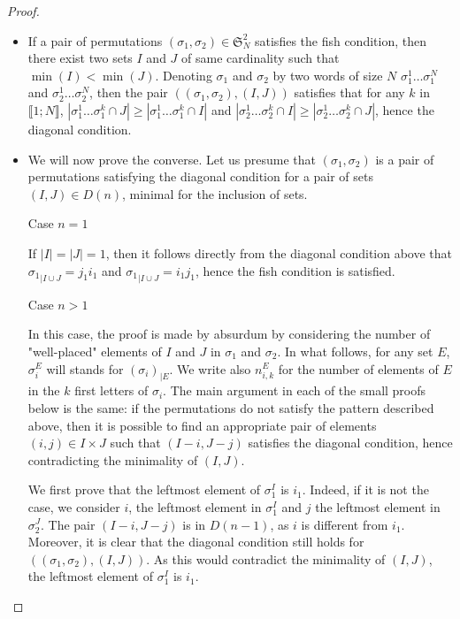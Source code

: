 \documentclass[11pt]{amsart}
\theoremstyle{definition}
\theoremstyle{remark}
\numberwithin{equation}{section}
\newcommand{\0}{\color{blue}{\mathsf{0}}}
\begin{document}
\begin{proof}
\begin{itemize}
\item If a pair of permutations $(\sigma_1, \sigma_2) \in   \mathfrak{S}_N^2$ satisfies the fish condition, then there exist two sets $I$ and $J$ of same cardinality such that $\min(I)<\min(J)$. Denoting $\sigma_1$ and $\sigma_2$ by two words of size $N$ $\sigma_1^1 \ldots \sigma_1^N$ and $\sigma_2^1 \ldots \sigma_2^N$, then the pair $((\sigma_1, \sigma_2), (I,J))$ satisfies that for any $k$ in $\llbracket 1;N\rrbracket$, $|\sigma_1^1 \ldots \sigma_1^k \cap J| \geq |\sigma_1^1 \ldots \sigma_1^k \cap I|$ and $|\sigma_2^1 \ldots \sigma_2^k \cap I| \geq |\sigma_2^1 \ldots \sigma_2^k \cap J|$, hence the diagonal condition.
\item We will now prove the converse. Let us presume that $(\sigma_1, \sigma_2)$ is a pair of permutations satisfying the diagonal condition for a pair of sets $(I,J) \in D(n)$, minimal for the inclusion of sets.
\begin{description}
\item[Case $n=1$] 
\end{description}
If $|I|=|J|=1$, then it follows directly from the diagonal condition above that ${\sigma_1}_{| I \cup J}=j_1 i_1$ and ${\sigma_1}_{|I \cup J}=i_1 j_1$, hence the fish condition is satisfied.
\begin{description}
\item[Case $n>1$] 
\end{description}
In this case, the proof is made by absurdum 
by considering the number of "well-placed" elements of $I$ and $J$ in $\sigma_1$ and $\sigma_2$. In what follows, for any set $E$, $\sigma^{E}_i$ will stands for $(\sigma_i)_{|E}$. We write also $n_{i,k}^E$ for the number of elements of $E$ in the $k$ first letters of $\sigma_i$. The main argument in each of the small proofs below is the same: if the permutations do not satisfy the pattern described above, then it is possible to find an appropriate pair of elements $(i,j)\in I \times J$ such that $(I-i,J-j)$ satisfies the diagonal condition, hence  contradicting the minimality of $(I,J)$.

We first prove that the leftmost element of $\sigma^{I}_1$ is $i_1$. Indeed, if it is not the case, we consider $i$, the leftmost element in $\sigma^{I}_1$ and $j$ the leftmost element in $\sigma^{J}_2$. The pair $(I-i,J-j)$ is in $D(n-1)$, as $i$ is different from $i_1$. Moreover, it is clear that the diagonal condition still holds for $((\sigma_1, \sigma_2), (I,J))$. As this would contradict the minimality of $(I,J)$, the leftmost element of $\sigma^{I}_1$ is $i_1$.


\end{itemize}
\end{proof}
\end{document}
